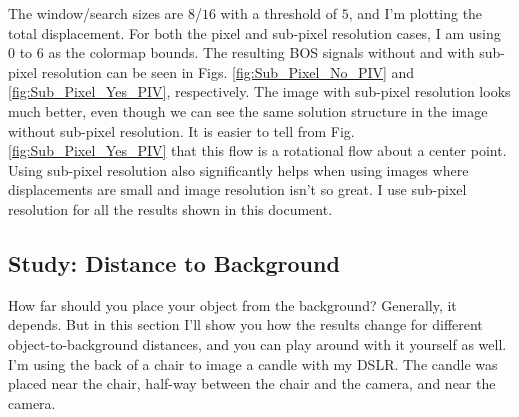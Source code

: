 \documentclass[letterpaper,12pt]{article}
\begin{document}
The window/search sizes are $8$/$16$ with a threshold of $5$, and I'm plotting the total displacement.  For both the pixel and sub-pixel resolution cases, I am using $0$ to $6$ as the colormap bounds.  The resulting BOS signals without and with sub-pixel resolution can be seen in Figs. \ref{fig:Sub_Pixel_No_PIV} and \ref{fig:Sub_Pixel_Yes_PIV}, respectively.  The image with sub-pixel resolution looks much better, even though we can see the same solution structure in the image without sub-pixel resolution.  It is easier to tell from Fig. \ref{fig:Sub_Pixel_Yes_PIV} that this flow is a rotational flow about a center point.  Using sub-pixel resolution also significantly helps when using images where displacements are small and image resolution isn't so great.  I use sub-pixel resolution for all the results shown in this document.

\subsection{Study: Distance to Background}
\label{subsec:Study_Distance_to_Background}

How far should you place your object from the background?  Generally, it depends.  But in this section I'll show you how the results change for different object-to-background distances, and you can play around with it yourself as well.  I'm using the back of a chair to image a candle with my DSLR.  The candle was placed near the chair, half-way between the chair and the camera, and near the camera.
\end{document}
